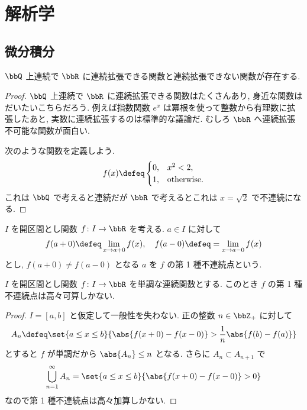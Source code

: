 \documentclass[openany, a4paper, oneside]{jsbook}
\begin{document}
\chapter{解析学}

\section{微分積分}

\begin{ex}
$\bbQ$ 上連続で $\bbR$ に連続拡張できる関数と連続拡張できない関数が存在する.
\end{ex}
\begin{proof}
$\bbQ$ 上連続で $\bbR$ に連続拡張できる関数はたくさんあり, 身近な関数はだいたいこちらだろう.
例えば指数関数 $e^x$ は冪根を使って整数から有理数に拡張したあと, 実数に連続拡張するのは標準的な議論だ.
むしろ $\bbR$ へ連続拡張不可能な関数が面白い.

次のような関数を定義しよう.
\begin{align}
 f(x)
 \defeq
 \begin{cases}
  0, & x^2 < 2, \\
  1, & \text{otherwise}.
 \end{cases}
\end{align}
これは $\bbQ$ で考えると連続だが $\bbR$ で考えるとこれは $x = \sqrt{2}$ で不連続になる.
\end{proof}

\begin{defn}
$I$ を開区間とし関数 $f \colon I \to \bbR$ を考える.
$a \in I$ に対して
\begin{align}
 f (a + 0)
 \defeq
 \lim_{x \to a + 0} f(x), \quad
 f (a - 0)
 \defeq
 =
 \lim_{x \to a - 0} f(x)
\end{align}
とし, $f(a+0) \neq f(a-0)$ となる $a$ を $f$ の第 1 種不連続点という.
\end{defn}
\begin{prop}
$I$ を開区間とし関数 $f \colon I \to \bbR$ を単調な連続関数とする.
このとき $f$ の第 1 種不連続点は高々可算しかない.
\end{prop}
\begin{proof}
$I = [a, b]$ と仮定して一般性を失わない.
正の整数 $n \in \bbZ_{+}$ に対して
\begin{align}
 A_n
 \defeq
 \set{a \leq x \leq b}{\abs{f(x+0) - f(x-0)} > \frac{1}{n} \abs{f(b) - f(a)}}
\end{align}
とすると $f$ が単調だから $\abs{A_n} \leq n$ となる.
さらに $A_n \subset A_{n+1}$ で
\begin{align}
 \bigcup_{n=1}^{\infty} A_n
 =
 \set{a \leq x \leq b}{\abs{f(x+0) - f(x-0)} > 0}
\end{align}
なので第 1 種不連続点は高々加算しかない.
\end{proof}
\end{document}
